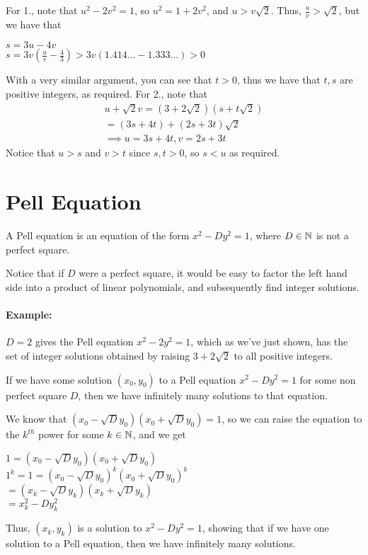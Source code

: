 \documentclass[../main.tex]{subfiles}
\begin{document}
\begin{pf}[Cont.]
    For 1., note that $u^2-2v^2=1$, so $u^2=1+2v^2$, and $u > v\sqrt{2}$. Thus, $\tfrac{u}{v}>\sqrt{2}$, but we have that
    \begin{center}
        $s=3u-4v$ \\
        $s=3v(\tfrac{u}{v}-\tfrac{4}{3}) > 3v(1.414...-1.333...)>0$
    \end{center}
    With a very similar argument, you can see that $t >0$, thus we have that $t,s$ are positive integers, as required. \sspace
    For 2., note that 
    \begin{align*}
        u+\sqrt{2}v=(3+2\sqrt{2})(s+t\sqrt{2}) \\
        =(3s+4t)+(2s+3t)\sqrt{2} \\
        \implies u=3s+4t, v=2s+3t
    \end{align*}
    Notice that $u > s$ and $v>t$ since $s,t > 0$, so $s < u$ as required.
\end{pf}

\section{Pell Equation}
\begin{defn}
    A Pell equation is an equation of the form $x^2-Dy^2=1$, where $D \in \mathbb{N}$ is not a perfect square.
\end{defn}
Notice that if $D$ were a perfect square, it would be easy to factor the left hand side into a product of linear polynomials, and subsequently find integer solutions.
\paragraph{Example:} $D=2$ gives the Pell equation $x^2-2y^2=1$, which as we've just shown, has the set of integer solutions obtained by raising $3+2\sqrt{2}$ to all positive integers. \\
\begin{thm}
    If we have some solution $(x_0,y_0)$ to a Pell equation $x^2-Dy^2=1$ for some non perfect square $D$, then we have infinitely many solutions to that equation.
\end{thm}
\begin{pf}
    We know that $(x_0-\sqrt{D}y_0)(x_0+\sqrt{D}y_0)=1$, so we can raise the equation to the $k^{th}$ power for some $k \in \mathbb{N}$, and we get
    \begin{center}
        $1=(x_0-\sqrt{D}y_0)(x_0+\sqrt{D}y_0)$ \\
        $1^k=1=(x_0-\sqrt{D}y_0)^k(x_0+\sqrt{D}y_0)^k$ \\
        $=(x_k-\sqrt{D}y_k)(x_k+\sqrt{D}y_k)$ \\
        $=x_k^2-Dy_k^2$
    \end{center}
    Thus, $(x_k,y_k)$ is a solution to $x^2-Dy^2=1$, showing that if we have one solution to a Pell equation, then we have infinitely many solutions.
\end{pf}
\end{document}
